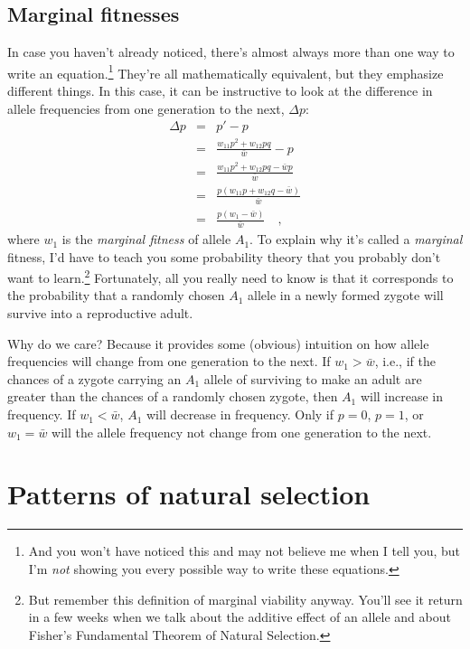 \subsection*{Marginal fitnesses}

In case you haven't already noticed, there's almost always more than
one way to write an equation.\footnote{And you won't have noticed this
  and may not believe me when I tell you, but I'm {\it not\/} showing
  you every possible way to write these equations.} They're all
mathematically equivalent, but they emphasize different things. In
this case, it can be instructive to look at the difference in allele
frequencies from one generation to the next, $\Delta p$:
\begin{eqnarray*}
\Delta p &=& p' - p \\
&=& \frac{w_{11}p^2 + w_{12}pq}{\bar w} - p \\
&=& \frac{w_{11}p^2 + w_{12}pq - \bar wp}{\bar w} \\
&=& \frac{p(w_{11}p + w_{12}q - \bar w)}{\bar w} \\
&=& \frac{p(w_1 - \bar w)}{\bar w} \quad ,
\end{eqnarray*}
where $w_1$ is the {\it marginal fitness\/} of allele $A_1$. To
explain why it's called a {\it marginal\/} fitness, I'd have to teach
you some probability theory that you probably don't want to
learn.\footnote{But remember this definition of marginal viability
anyway. You'll see it return in a few weeks when we talk about the
additive effect of an allele and about Fisher's Fundamental Theorem of
Natural Selection.} Fortunately, all you really need to know is that
it corresponds to the probability that a randomly chosen $A_1$ allele
in a newly formed zygote will survive into a reproductive
adult.

Why do we care? Because it provides some (obvious) intuition on how
allele frequencies will change from one generation to the next. If
$w_1 > \bar w$, i.e., if the chances of a zygote carrying an $A_1$
allele of surviving to make an adult are greater than the chances of a
randomly chosen zygote, then $A_1$ will increase in frequency. If $w_1
< \bar w$, $A_1$ will decrease in frequency. Only if $p=0$, $p=1$, or
$w_1=\bar w$ will the allele frequency not change from one generation
to the next.

\section*{Patterns of natural selection}

